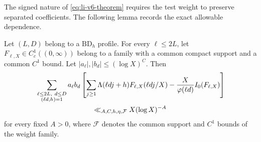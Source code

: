 The signed nature of \eqref{eq:li-v6-theorem} requires the test weight to
preserve separated coefficients.  The following lemma records the exact
allowable dependence.

\begin{lemma}
\label{lem:one-factor-smooth-transfer}
Let $(L,D)$ belong to a $\mathrm{BD}_h$ profile.  For every $\ell\le2L$,
let $F_{\ell,X}\in C_c^1((0,\infty))$ belong to a family with a common
compact support and a common $C^1$ bound.  Let
$|a_\ell|,|b_d|\le(\log X)^C$.  Then
\begin{align}
 &\sum_{\substack{\ell\le2L,\ d\le D\\(\ell d,h)=1}}
 a_\ell b_d
 \left[
 \sum_{j\ge1}\Lambda(\ell dj+h)
 F_{\ell,X}(\ell dj/X)
 -\frac{X}{\varphi(\ell d)}I_0(F_{\ell,X})
 \right]
 \notag\\
 &\hspace{8em}\ll_{A,C,h,\eta,\mathcal F}X(\log X)^{-A}
 \label{eq:smooth-lambda-transfer}
\end{align}
for every fixed $A>0$, where $\mathcal F$ denotes the common support
and $C^1$ bounds of the weight family.
\end{lemma}

